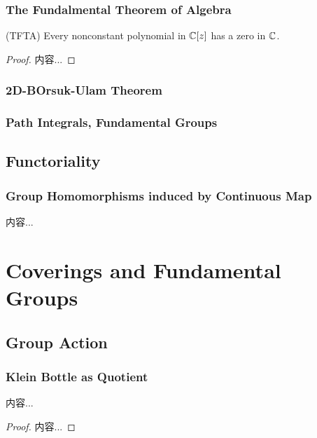 \documentclass[Total.tex]{subfiles}
\begin{document}
			\subsubsection{The Fundalmental Theorem of Algebra}
			\begin{theorem}
				(TFTA) Every nonconstant polynomial in $\mathbb{C}[z]$ has a zero in $\mathbb{C}$.
			\end{theorem}
			\begin{proof}
				内容...
			\end{proof}
			\subsubsection{2D-BOrsuk-Ulam Theorem}
			\subsubsection{Path Integrals, Fundamental Groups}
			\subsection{Functoriality}
			\subsubsection{Group Homomorphisms induced by Continuous Map}
			\begin{Def}
				内容...
			\end{Def}
		\section{Coverings and Fundamental Groups}
			\subsection{Group Action}
			\subsubsection{Klein Bottle as Quotient}
			\begin{lemma}
				内容...
			\end{lemma}
			\begin{proof}
				内容...
			\end{proof}
\end{document}
